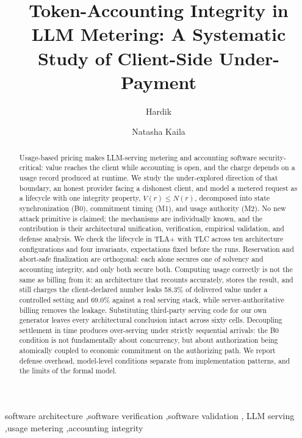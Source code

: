 \documentclass[preprint,3p,authoryear,12pt]{elsarticle}
\begin{document}
\begin{frontmatter}

\title{Token-Accounting Integrity in LLM Metering: A Systematic Study of Client-Side
Under-Payment}

\author[iitp,vips]{Hardik}
\author[vipstc]{Natasha Kaila}
\address[iitp]{Department of Computer Science and Data Analytics, Indian Institute of
Technology Patna, India}
\address[vips]{Vivekananda School of Engineering and Technology, Vivekananda Institute
of Professional Studies - Technical Campus, New Delhi, India}
\address[vipstc]{Vivekananda Institute of Professional Studies - Technical Campus,
New Delhi, India}

\begin{abstract}
Usage-based pricing makes LLM-serving metering and accounting software
security-critical: value reaches the client while accounting is open, and the
charge depends on a usage record produced at runtime. We study the under-explored
direction of that boundary, an honest provider facing a dishonest client, and model a
metered request as a lifecycle with
one integrity property, $V(r) \le N(r)$, decomposed into state synchronization (B0),
commitment timing (M1), and usage authority (M2). No new attack primitive is claimed; the
mechanisms are individually known, and the contribution is their architectural
unification, verification, empirical validation, and defense analysis. We check the lifecycle in TLA+ with TLC
across ten architecture configurations and four invariants, expectations fixed before the
runs. Reservation and abort-safe finalization are orthogonal: each alone secures one of
solvency and accounting integrity, and only both secure both. Computing usage correctly
is not the same as billing from it: an architecture that recounts accurately, stores the
result, and still charges the client-declared number leaks 58.3\% of delivered value
under a controlled setting and 69.0\% against a real serving stack, while
server-authoritative billing removes the leakage. Substituting third-party serving code
for our own generator leaves every architectural conclusion intact across sixty cells.
Decoupling settlement in time produces over-serving under strictly sequential arrivals:
the B0 condition is not fundamentally about concurrency, but about authorization being
atomically coupled to economic commitment on the authorizing path. We report defense
overhead, model-level conditions separate from implementation patterns, and the limits of
the formal model.
\end{abstract}

\begin{keyword}
software architecture \sep software verification \sep software validation \sep
LLM serving \sep usage metering \sep accounting integrity
\end{keyword}

\end{frontmatter}
\end{document}
